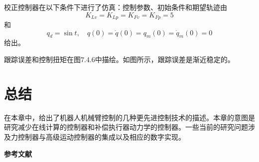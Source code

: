 \documentclass[UTF8]{ctexart}
\begin{document}
校正控制器在以下条件下进行了仿真：控制参数、初始条件和期望轨迹由
\begin{equation*}
K_{Lv}=K_{Lp}=K_{Fv}=K_{Fp}=5
\end{equation*}
和
\begin{equation*}
q_d=\sin t,\quad q(0)=\dot{q}(0)=q_m(0)=\dot{q}_m(0)=0
\end{equation*}
给出。

跟踪误差和控制扭矩在图7.4.6中描绘。如图所示，跟踪误差是渐近稳定的。

\section{总结}

在本章中，给出了机器人机械臂控制的几种更先进控制技术的描述。本章的意图是研究减少在线计算的控制器和补偿执行器动力学的控制器。一些当前的研究问题涉及力控制器与高级运动控制器的集成以及相应的数字实现。

\vspace{1cm}
\noindent\textbf{参考文献}
\end{document}
